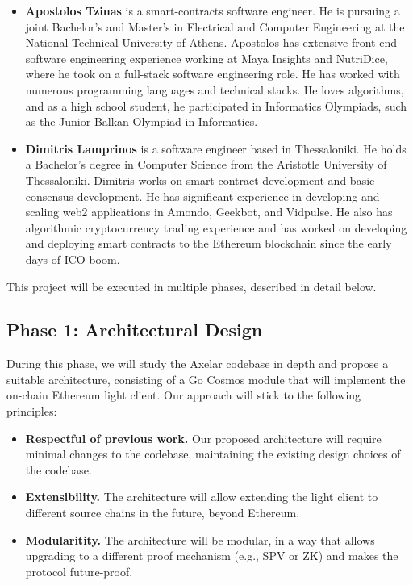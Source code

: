 \begin{itemize}
  \item \textbf{Apostolos Tzinas} is a smart-contracts software engineer. He is pursuing a joint Bachelor’s and Master’s in Electrical and Computer Engineering at the National Technical University of Athens. Apostolos has extensive front-end software engineering experience working at Maya Insights and NutriDice, where he took on a full-stack software engineering role. He has worked with numerous programming languages and technical stacks. He loves algorithms, and as a high school student, he participated in Informatics Olympiads, such as the Junior Balkan Olympiad in Informatics. 
  \item \textbf{Dimitris Lamprinos} is a software engineer based in Thessaloniki. He holds a Bachelor’s degree in Computer Science from the Aristotle University of Thessaloniki. Dimitris works on smart contract development and basic consensus development. He has significant experience in developing and scaling web2 applications in Amondo, Geekbot, and Vidpulse. He also has algorithmic cryptocurrency trading experience and has worked on developing and deploying smart contracts to the Ethereum
    blockchain since the early days of ICO boom.
\end{itemize}

This project will be executed in multiple phases, described in detail below.

\subsection{Phase 1: Architectural Design}
During this phase, we will study the Axelar codebase in depth and propose a suitable architecture, consisting of a Go Cosmos module that will implement the on-chain Ethereum light client.
Our approach will stick to the following principles: 
\begin{itemize}
  \item \textbf{Respectful of previous work.} Our proposed architecture will require minimal changes to the codebase, maintaining the existing design choices of the codebase.
  \item \textbf{Extensibility.} The architecture will allow extending the light client to different source chains in the future, beyond Ethereum.
  \item \textbf{Modularitity.} The architecture will be modular, in a way that allows upgrading to a different proof mechanism (e.g., SPV or ZK) and makes the protocol future-proof.
\end{itemize}

